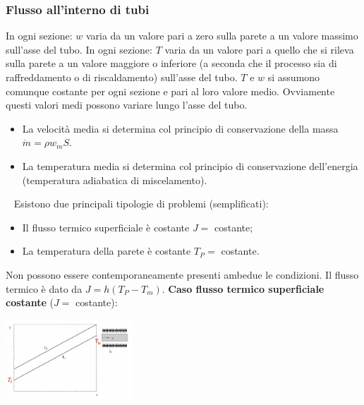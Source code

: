 \subsubsection{Flusso all'interno di tubi}
In ogni sezione: $w$ varia da un valore pari a zero sulla parete a un valore
massimo sull’asse del tubo. \newline
\newline
In ogni sezione: $T$ varia da un valore pari a quello che si rileva sulla parete a
un valore maggiore o inferiore (a seconda che il processo sia di
raffreddamento o di riscaldamento) sull’asse del tubo.\newline
\newline
$T$ e $w$ si assumono comunque costante per ogni sezione e pari al loro valore
medio. Ovviamente questi valori medi possono variare lungo l’asse del tubo.
\newline
\begin{itemize}
    \item La velocità media si determina col principio di conservazione della massa $\dot{m} = \rho w_m S$.
    \item La temperatura media si determina col principio di conservazione dell'energia (temperatura adiabatica di miscelamento).
\end{itemize}
\ \newline
Esistono due principali tipologie di problemi (semplificati):
\begin{itemize}
    \item Il flusso termico superficiale è costante $J =$ costante;
    \item La temperatura della parete è costante $T_P =$ costante.
\end{itemize}
Non possono essere contemporaneamente presenti ambedue le condizioni.\newline
\newline
Il flusso termico è dato da $J = h (T_P - T_m)$.\newline
\newline
\textbf{Caso flusso termico superficiale costante} ($J =$ costante):
\begin{center}
    \includegraphics[height=3cm]{../L11/img3.PNG}
\end{center}
